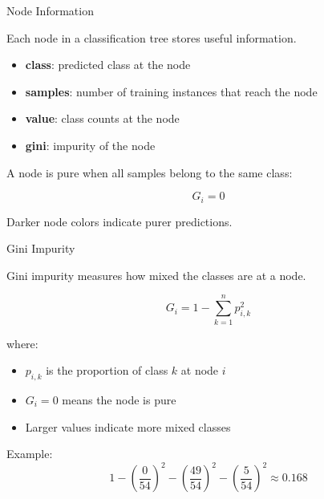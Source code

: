 \documentclass[aspectratio=169]{beamer}
\begin{document}

\begin{frame}{Node Information}
	
	Each node in a classification tree stores useful information.
	
	\vspace{0.5em}
	
	\begin{itemize}
		\item \textbf{class}: predicted class at the node
		\item \textbf{samples}: number of training instances that reach the node
		\item \textbf{value}: class counts at the node
		\item \textbf{gini}: impurity of the node
	\end{itemize}
	
	\vspace{0.75em}
	
	A node is pure when all samples belong to the same class:
	
	\[
	G_i = 0
	\]
	
	\vspace{0.5em}
	
	Darker node colors indicate purer predictions.
	
\end{frame}


\begin{frame}{Gini Impurity}
	
	Gini impurity measures how mixed the classes are at a node.
	
	\[
	G_i
	=
	1 -
	\sum_{k=1}^{n}p_{i,k}^{2}
	\]
	
	\vspace{0.5em}
	
	where:
	
	\begin{itemize}
		\item $p_{i,k}$ is the proportion of class $k$ at node $i$
		\item $G_i=0$ means the node is pure
		\item Larger values indicate more mixed classes
	\end{itemize}
	
	\vspace{0.75em}
	
	Example:
	\[
	1-\left(\frac{0}{54}\right)^2
	-\left(\frac{49}{54}\right)^2
	-\left(\frac{5}{54}\right)^2
	\approx 0.168
	\]
	
\end{frame}
\end{document}
